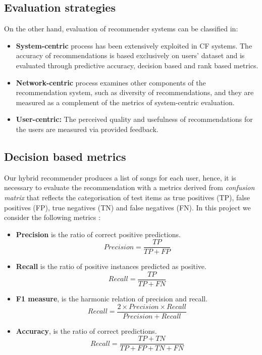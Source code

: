 \subsection{Evaluation strategies}
On the other hand, evaluation of recommender systems can be classified \parencite{1242} in:
\begin{itemize}
\item \textbf{System-centric} process has been extensively exploited in CF systems. The accuracy of recommendations is based exclusively on users' dataset and is evaluated through predictive accuracy, decision based and rank based metrics.
\item \textbf{Network-centric} process examines other components of the recommendation system, such as diversity of recommendations, and they are measured as a complement of the metrics of system-centric evaluation.
\item \textbf{User-centric:} The perceived quality and usefulness of recommendations for the users are measured via provided feedback.
\end{itemize}

\subsection{Decision based metrics}
Our hybrid recommender produces a list of songs for each user, hence, it is necessary to evaluate the recommendation with a metrics derived from \textit{confusion matrix} that reflects the categorisation of test items as true positives (TP), false positives (FP), true negatives (TN) and false negatives (FN). In this project we consider the following metrics \parencite{1242}:
\begin{itemize}
	\item \textbf{Precision} is the ratio of correct positive predictions.
	\begin{equation}
	Precision = \frac{TP} {TP+FP}\label{eq:1}
	\end{equation}
	\item \textbf{Recall} is the ratio of positive instances predicted as positive.
	\begin{equation}
	Recall = \frac{TP} {TP+FN}\label{eq:2}
	\end{equation}
	\item \textbf{F1 measure}, is the harmonic relation of precision and recall.
	\begin{equation}
	Recall = \frac{2 \times Precision \times Recall} {Precision+Recall}\label{eq:3}
	\end{equation}
	\item \textbf{Accuracy}, is the ratio of correct predictions.
	\begin{equation}
	Recall = \frac{TP+TN} {TP+FP+TN+FN}\label{eq:4}
	\end{equation}
\end{itemize}


